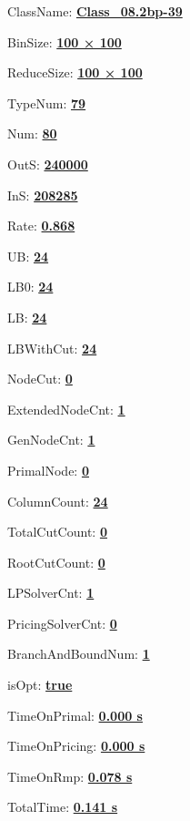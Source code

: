 \documentclass[11pt]{article}
\begin{document}
\pagestyle{empty}


ClassName: \underline{\textbf{Class_08.2bp-39}}
\par
BinSize: \underline{\textbf{100 × 100}}
\par
ReduceSize: \underline{\textbf{100 × 100}}
\par
TypeNum: \underline{\textbf{79}}
\par
Num: \underline{\textbf{80}}
\par
OutS: \underline{\textbf{240000}}
\par
InS: \underline{\textbf{208285}}
\par
Rate: \underline{\textbf{0.868}}
\par
UB: \underline{\textbf{24}}
\par
LB0: \underline{\textbf{24}}
\par
LB: \underline{\textbf{24}}
\par
LBWithCut: \underline{\textbf{24}}
\par
NodeCut: \underline{\textbf{0}}
\par
ExtendedNodeCnt: \underline{\textbf{1}}
\par
GenNodeCnt: \underline{\textbf{1}}
\par
PrimalNode: \underline{\textbf{0}}
\par
ColumnCount: \underline{\textbf{24}}
\par
TotalCutCount: \underline{\textbf{0}}
\par
RootCutCount: \underline{\textbf{0}}
\par
LPSolverCnt: \underline{\textbf{1}}
\par
PricingSolverCnt: \underline{\textbf{0}}
\par
BranchAndBoundNum: \underline{\textbf{1}}
\par
isOpt: \underline{\textbf{true}}
\par
TimeOnPrimal: \underline{\textbf{0.000 s}}
\par
TimeOnPricing: \underline{\textbf{0.000 s}}
\par
TimeOnRmp: \underline{\textbf{0.078 s}}
\par
TotalTime: \underline{\textbf{0.141 s}}
\par
\newpage


\end{document}
